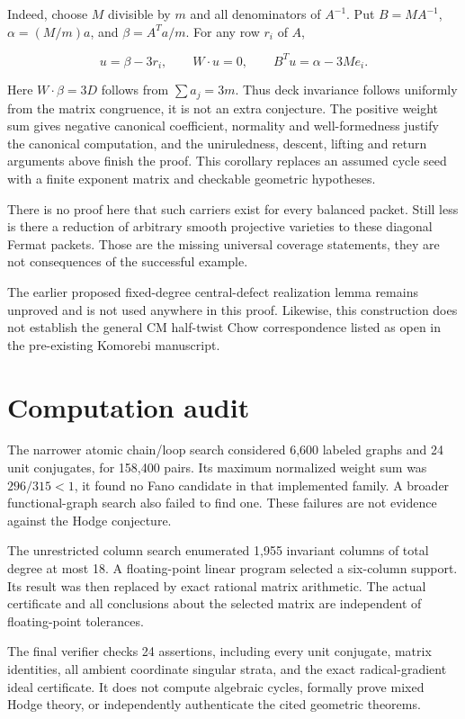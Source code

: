 Indeed, choose \(M\) divisible by \(m\) and all denominators of
\(A^{-1}\). Put \(B=MA^{-1}\), \(\alpha=(M/m)a\), and \(\beta=A^Ta/m\).
For any row \(r_i\) of \(A\),

\[
u=\beta-3r_i,\qquad W\cdot u=0,\qquad
B^Tu=\alpha-3Me_i.
\]

Here \(W\cdot\beta=3D\) follows from \(\sum a_j=3m\). Thus deck
invariance follows uniformly from the matrix congruence, it is not an
extra conjecture. The positive weight sum gives negative canonical
coefficient, normality and well-formedness justify the canonical
computation, and the uniruledness, descent, lifting and return arguments
above finish the proof. This corollary replaces an assumed cycle seed
with a finite exponent matrix and checkable geometric hypotheses.

There is no proof here that such carriers exist for every balanced
packet. Still less is there a reduction of arbitrary smooth projective
varieties to these diagonal Fermat packets. Those are the missing
universal coverage statements, they are not consequences of the
successful example.

The earlier proposed fixed-degree central-defect realization lemma
remains unproved and is not used anywhere in this proof. Likewise, this
construction does not establish the general CM half-twist Chow
correspondence listed as open in the pre-existing Komorebi manuscript.

\hypertarget{carrier70-computation-audit}{%
\section{Computation audit}\label{carrier70-computation-audit}}

The narrower atomic chain/loop search considered 6,600 labeled graphs
and 24 unit conjugates, for 158,400 pairs. Its maximum normalized weight
sum was \(296/315<1\), it found no Fano candidate in that implemented
family. A broader functional-graph search also failed to find one. These
failures are not evidence against the Hodge conjecture.

The unrestricted column search enumerated 1,955 invariant columns of
total degree at most 18. A floating-point linear program selected a
six-column support. Its result was then replaced by exact rational
matrix arithmetic. The actual certificate and all conclusions about the
selected matrix are independent of floating-point tolerances.

The final verifier checks 24 assertions, including every unit conjugate,
matrix identities, all ambient coordinate singular strata, and the exact
radical-gradient ideal certificate. It does not compute algebraic
cycles, formally prove mixed Hodge theory, or independently authenticate
the cited geometric theorems.
